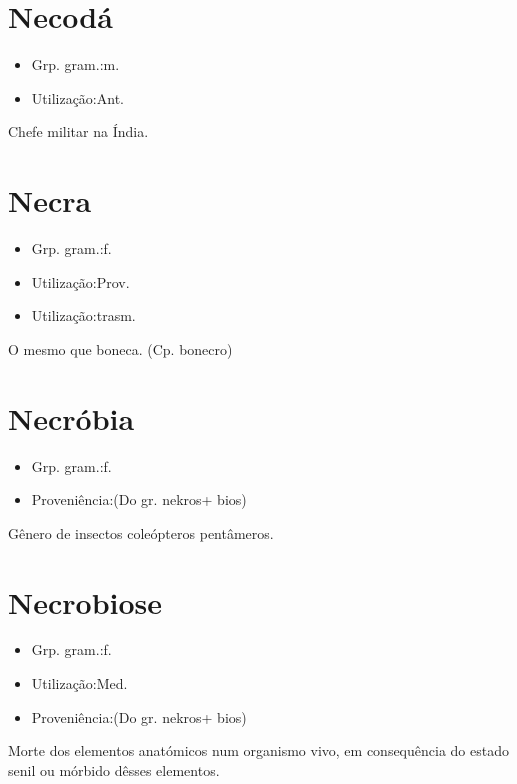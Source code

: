 \section{Necodá}
\begin{itemize}
\item {Grp. gram.:m.}
\end{itemize}
\begin{itemize}
\item {Utilização:Ant.}
\end{itemize}
Chefe militar na Índia.
\section{Necra}
\begin{itemize}
\item {Grp. gram.:f.}
\end{itemize}
\begin{itemize}
\item {Utilização:Prov.}
\end{itemize}
\begin{itemize}
\item {Utilização:trasm.}
\end{itemize}
O mesmo que \textunderscore boneca\textunderscore .
(Cp. \textunderscore bonecro\textunderscore )
\section{Necróbia}
\begin{itemize}
\item {Grp. gram.:f.}
\end{itemize}
\begin{itemize}
\item {Proveniência:(Do gr. \textunderscore nekros\textunderscore  + \textunderscore bios\textunderscore )}
\end{itemize}
Gênero de insectos coleópteros pentâmeros.
\section{Necrobiose}
\begin{itemize}
\item {Grp. gram.:f.}
\end{itemize}
\begin{itemize}
\item {Utilização:Med.}
\end{itemize}
\begin{itemize}
\item {Proveniência:(Do gr. \textunderscore nekros\textunderscore  + \textunderscore bios\textunderscore )}
\end{itemize}
Morte dos elementos anatómicos num organismo vivo, em consequência do estado senil ou mórbido dêsses elementos.
